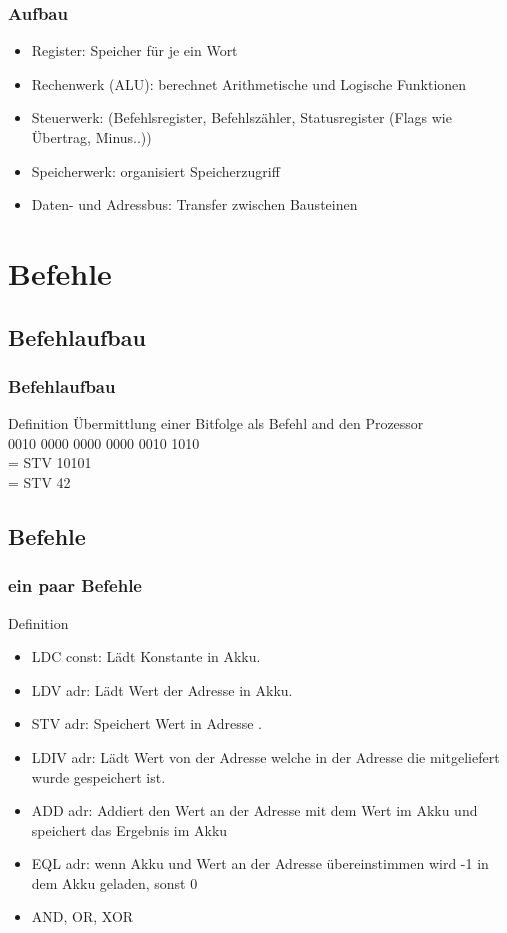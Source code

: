\documentclass{beamer}
\begin{document}
\begin{frame}
	\frametitle{Aufbau}
	\begin{block}{}
		\begin{itemize}
			\item Register: Speicher für je ein Wort
			\item Rechenwerk (ALU): berechnet Arithmetische und Logische Funktionen 
			\item Steuerwerk: (Befehlsregister, Befehlszähler, Statusregister (Flags wie Übertrag, Minus..))
			\item Speicherwerk: organisiert Speicherzugriff
			\item Daten- und Adressbus: Transfer zwischen Bausteinen
		\end{itemize}
	\end{block}
\end{frame}

\section{Befehle}
\subsection{Befehlaufbau}
\begin{frame}
	\frametitle{Befehlaufbau}
	\begin{block}{Definition}
		Übermittlung einer Bitfolge als Befehl and den Prozessor\\
		0010 0000 0000 0000 0010 1010 \\
		= STV 10101\\
		= STV 42
	\end{block}
\end{frame}

\subsection{Befehle}
\begin{frame}
	\frametitle{ein paar Befehle}
	\begin{block}{Definition}
		\begin{itemize}
			\item LDC const: Lädt Konstante in Akku.
			\item LDV adr: Lädt Wert der Adresse in Akku.
			\item STV adr: Speichert Wert in Adresse .
			\item LDIV adr: Lädt Wert von der Adresse welche in der 				Adresse die mitgeliefert wurde gespeichert ist.
			\item ADD adr: Addiert den Wert an der Adresse mit dem 					Wert im Akku und speichert das Ergebnis im Akku
			\item EQL adr: wenn Akku und Wert an der Adresse übereinstimmen wird -1 in dem Akku geladen, sonst 0
			\item AND, OR, XOR 
		\end{itemize}
	\end{block}
\end{frame}
\end{document}
